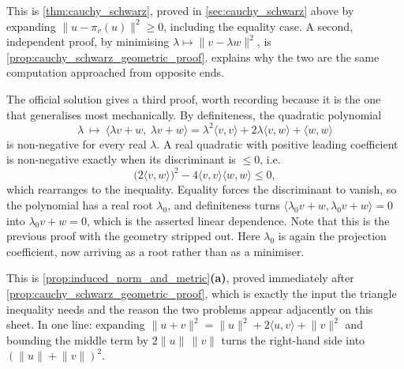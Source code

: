 \begin{exercisesolution}
\label{sol:cauchy_schwarz_statement}
This is \cref{thm:cauchy_schwarz}, proved in \cref{sec:cauchy_schwarz} above by expanding
$\lVert u - \pi_v(u)\rVert^2 \geq 0$, including the equality case. A second, independent proof, by
minimising $\lambda \mapsto \lVert v-\lambda w\rVert^2$, is
\cref{prop:cauchy_schwarz_geometric_proof}. 
explains why the two are the same computation approached from opposite ends.

\begin{remark}
The official solution gives a third proof, worth recording because it is the one that
generalises most mechanically. By definiteness, the quadratic polynomial
\[\lambda \ \longmapsto\ \langle \lambda v + w,\ \lambda v + w\rangle
  = \lambda^2\langle v,v\rangle + 2\lambda\langle v,w\rangle + \langle w,w\rangle\]
is non-negative for every real $\lambda$. A real quadratic with positive leading coefficient is
non-negative exactly when its discriminant is $\leq 0$, i.e.
\[\big(2\langle v,w\rangle\big)^2 - 4\langle v,v\rangle\langle w,w\rangle \leq 0,\]
which rearranges to the inequality. Equality forces the discriminant to vanish, so the
polynomial has a real root $\lambda_0$, and definiteness turns
$\langle \lambda_0 v + w, \lambda_0 v + w\rangle = 0$ into $\lambda_0 v + w = 0$, which is the
asserted linear dependence. Note that this is the previous proof with the geometry stripped out.
Here $\lambda_0$ is again the projection coefficient, now arriving as a root rather than as a
minimiser.
\end{remark}
\end{exercisesolution}

\begin{exercisesolution}
\label{sol:inner_product_induced_norm}
This is \cref{prop:induced_norm_and_metric}\textbf{(a)}, proved immediately after
\cref{prop:cauchy_schwarz_geometric_proof}, which is exactly the input the triangle inequality
needs and the reason the two problems appear adjacently on this sheet. In one line: expanding
$\lVert u+v\rVert^2 = \lVert u\rVert^2 + 2\langle u,v\rangle + \lVert v\rVert^2$ and bounding the
middle term by $2\lVert u\rVert\,\lVert v\rVert$ turns the right-hand side into
$(\lVert u\rVert + \lVert v\rVert)^2$.
\end{exercisesolution}

